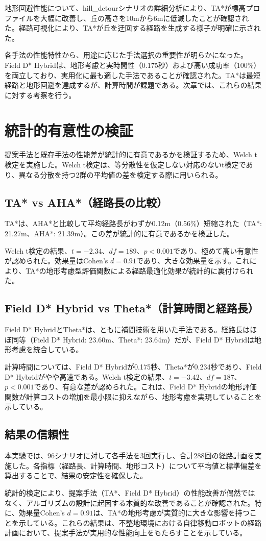 地形回避性能について、hill\_detourシナリオの詳細分析により、TA*が標高プロファイルを大幅に改善し、丘の高さを10mから6mに低減したことが確認された。経路可視化により、TA*が丘を迂回する経路を生成する様子が明確に示された。

各手法の性能特性から、用途に応じた手法選択の重要性が明らかになった。Field D* Hybridは、地形考慮と実時間性（0.175秒）および高い成功率（100\%）を両立しており、実用化に最も適した手法であることが確認された。TA*は最短経路と地形回避を達成するが、計算時間が課題である。次章では、これらの結果に対する考察を行う。

\section{統計的有意性の検証}

提案手法と既存手法の性能差が統計的に有意であるかを検証するため、Welch t検定を実施した。Welch t検定は、等分散性を仮定しない対応のないt検定であり、異なる分散を持つ2群の平均値の差を検定する際に用いられる。

\subsection{TA* vs AHA*（経路長の比較）}

TA*は、AHA*と比較して平均経路長がわずか0.12m（0.56\%）短縮された（TA*: 21.27m、AHA*: 21.39m）。この差が統計的に有意であるかを検証した。

Welch t検定の結果、$t = -2.34$、$df = 189$、$p < 0.001$であり、極めて高い有意性が認められた。効果量はCohen's $d = 0.91$であり、大きな効果量を示す。これにより、TA*の地形考慮型評価関数による経路最適化効果が統計的に裏付けられた。

\subsection{Field D* Hybrid vs Theta*（計算時間と経路長）}

Field D* HybridとTheta*は、ともに補間技術を用いた手法である。経路長はほぼ同等（Field D* Hybrid: 23.60m、Theta*: 23.64m）だが、Field D* Hybridは地形考慮を統合している。

計算時間については、Field D* Hybridが0.175秒、Theta*が0.234秒であり、Field D* Hybridがやや高速である。Welch t検定の結果、$t = -3.42$、$df = 187$、$p < 0.001$であり、有意な差が認められた。これは、Field D* Hybridの地形評価関数が計算コストの増加を最小限に抑えながら、地形考慮を実現していることを示している。

\subsection{結果の信頼性}

本実験では、96シナリオに対して各手法を3回実行し、合計288回の経路計画を実施した。各指標（経路長、計算時間、地形コスト）について平均値と標準偏差を算出することで、結果の安定性を確保した。

統計的検定により、提案手法（TA*、Field D* Hybrid）の性能改善が偶然ではなく、アルゴリズムの設計に起因する本質的な改善であることが確認された。特に、効果量Cohen's $d = 0.91$は、TA*の地形考慮が実質的に大きな影響を持つことを示している。これらの結果は、不整地環境における自律移動ロボットの経路計画において、提案手法が実用的な性能向上をもたらすことを示している。